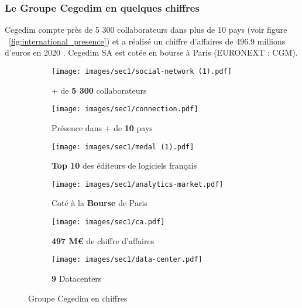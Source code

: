 \subsubsection{Le Groupe Cegedim en quelques chiffres}
Cegedim compte près de 5 300 collaborateurs dans plus de 10 pays (voir figure ~\ref{fig:international_presence}) et a réalisé un chiffre d’affaires de 496.9 millions d’euros en 2020 \cite{cegedim-ca}.
Cegedim SA est cotée en bourse à Paris (EURONEXT : CGM).
\begin{figure}[H]
    \centering
    \begin{subfigure}[t]{0.3\textwidth}
    \centering
        \texttt{[image: images/sec1/social-network (1).pdf]}
        \caption*{\centering + de \textbf{5 300} collaborateurs}
    \end{subfigure}
   \par\bigskip
    \begin{subfigure}[t]{0.3\textwidth}
    \centering
        \texttt{[image: images/sec1/connection.pdf]}
        \caption*{Présence dans + de \textbf{10} pays}
    \end{subfigure}
    \hfill
    \begin{subfigure}[t]{0.3\textwidth}
    \centering
        \texttt{[image: images/sec1/medal (1).pdf]}
        \caption*{\centering \textbf{Top 10} des éditeurs de logiciels français\protect\footnotemark}
    \end{subfigure}
    \hfill
    \begin{subfigure}[t]{0.3\textwidth}
    \centering
        \texttt{[image: images/sec1/analytics-market.pdf]}
        \caption*{\centering Coté à la \textbf{Bourse} de Paris}
    \end{subfigure}
    \par\bigskip
    \begin{subfigure}[t]{0.3\textwidth}
    \begin{center}
        \texttt{[image: images/sec1/ca.pdf]}
        \caption*{\centering \textbf{497 M€} de chiffre d’affaires}
    \end{center}
    \end{subfigure}
    \begin{subfigure}[t]{0.3\textwidth}
    \centering
        \texttt{[image: images/sec1/data-center.pdf]}
        \caption*{\textbf{9} Datacenters}
    \end{subfigure}
    \caption{Groupe Cegedim en chiffres}
    \label{fig:subfigures}
\end{figure}
